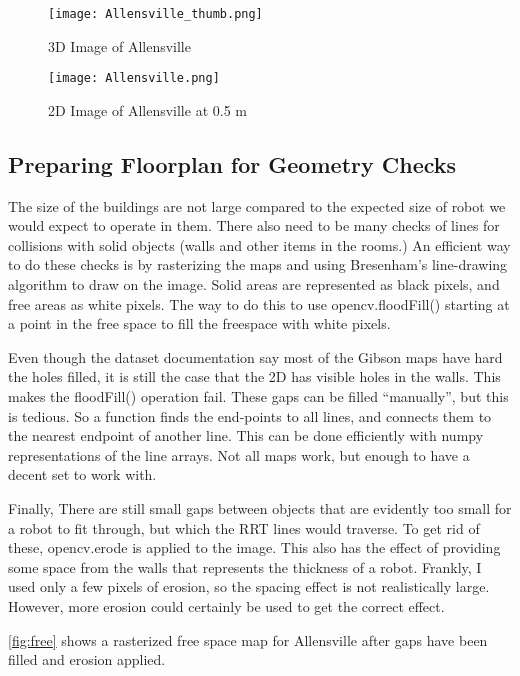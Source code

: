 \documentclass[10pt,twocolumn,letterpaper]{article}
\begin{document}
\begin{centering}
\begin{figure}[ht]
\caption{3D Image of Allensville}
\centering
\texttt{[image: Allensville\_thumb.png]}
\label{fig:Allensville_3D}
\end{figure}
\begin{figure}[ht]
\caption{2D Image of Allensville at 0.5 m}
\centering
\texttt{[image: Allensville.png]}
\label{fig:Allensville_2D}
\end{figure}
\end{centering}

\subsection{Preparing Floorplan for Geometry Checks}

The size of the buildings are not large compared to the expected size
of robot we would expect to operate in them. There also need to be
many checks of lines for collisions with solid objects (walls and
other items in the rooms.) An efficient way to do these checks is by
rasterizing the maps and using Bresenham's line-drawing algorithm to
draw on the image. Solid areas are represented as black pixels, and
free areas as white pixels. The way to do this to use opencv.floodFill()
starting at a point in the free space to fill the freespace with white
pixels.

Even though the dataset documentation say most of the Gibson maps have
hard the holes filled, it is still the case that the 2D has visible
holes in the walls. This makes the floodFill() operation fail. These
gaps can be filled ``manually'', but this is tedious. So a function
finds the end-points to all lines, and connects them to the nearest
endpoint of another line. This can be done efficiently with numpy
representations of the line arrays. Not all maps work, but enough to
have a decent set to work with.

Finally, There are still small gaps between objects that are evidently
too small for a robot to fit through, but which the RRT lines would
traverse. To get rid of these, opencv.erode is applied to the
image. This also has the effect of providing some space from the walls
that represents the thickness of a robot. Frankly, I used only a few
pixels of erosion, so the spacing effect is not realistically
large. However, more erosion could certainly be used to get the
correct effect.

\ref{fig:free} shows a rasterized free space map for Allensville after
gaps have been filled and erosion applied.
\end{document}
